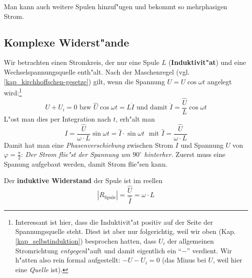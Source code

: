 Man kann auch weitere Spulen hinzuf"ugen und bekommt so mehrphasigen Strom.











\subsection{Komplexe Widerst"ande}
\label{kap_komplexe-widerstande}

Wir betrachten einen Stromkreis, der nur eine Spule $L$
(\textbf{Induktivit"at}) und eine
Wechselspannungsquelle enth"alt. Nach der Maschenregel
(vgl. \ref{kap_kirchhoffschen-gesetze}) gilt, wenn die Spannung $U =
\hat U \cos \omega t$ angelegt wird:\footnote{Interessant ist hier,
  dass die Induktivit"at positiv auf der Seite der Spannungsquelle
  steht. Diest ist aber nur folgerichtig, weil wir oben
  (Kap. \ref{kap_selbstinduktion}) besprochen hatten, dass $U_i$ der
  allgemeinen Stromrichtung \emph{entgegen}l"auft und damit eigentlich
ein "`$-$"' verdient. Wir h"atten also rein formal aufgestellt: $-U -
U_i = 0$ (das Minus bei $U$, weil hier eine \emph{Quelle} ist).}
\begin{equation}
   \label{eq:349}
   U + U_i = 0 \text{ bzw } \hat U \cos \omega t = L \dot I \text{ und
   damit } \dot I = \frac{\hat U}{L} \cos \omega t
\end{equation}
L"ost man dies per Integration nach $t$, erh"alt man
\begin{equation}
   \label{eq:350}
   I = \frac{\hat U}{\omega \cdot L} \sin \omega t = \hat I \cdot \sin
   \omega t \text{~ mit } \hat I = \frac{\hat U}{\omega \cdot L}
\end{equation}
Damit hat man eine \emph{Phasenverschiebung} zwischen Strom $I$ und
Spannung $U$ von $\varphi = \frac{\pi}{2}$: \emph{Der Strom flie"st der
Spannung um $90^\circ$ hinterher.} Zuerst muss eine Spanung aufgebaut
werden, damit Strom flie"sen kann.

Der \textbf{induktive Widerstand} der Spule ist im reellen
\begin{equation}
   \label{eq:351}
   |R_\text{Spule}| = \frac{\hat U}{\hat I} = \omega \cdot L
\end{equation}






